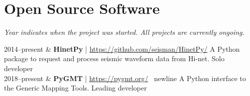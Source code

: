 \section{Open Source Software}

\emph{Year indicates when the project was started. All projects are currently ongoing.}

\begin{EntriesTable}{0.13}{0.02}{0.85}
2014--present & \textbf{HinetPy} | \url{https://github.com/seisman/HinetPy/} \newline
                A Python package to request and process seismic waveform data from Hi-net. \newline
                Solo developer \\
2018--present & \textbf{PyGMT} | \url{https://pygmt.org/} \ newline
                A Python interface to the Generic Mapping Tools. \newline
                Leading developer \\
\end{EntriesTable}

